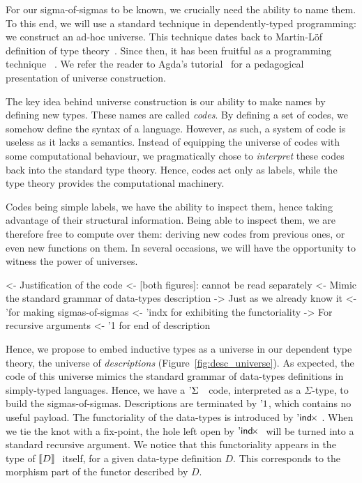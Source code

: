 
For our sigma-of-sigmas to be known, we crucially need the ability to
name them. To this end, we will use a standard technique in
dependently-typed programming: we construct an ad-hoc universe. This
technique dates back to Martin-L\"of definition of type
theory~\cite{martin-lof:itt}. Since then, it has been fruitful as a
programming technique~\cite{who?} . We refer
the reader to Agda's tutorial~\cite{norell:agda-tutorial} for a
pedagogical presentation of universe construction.

The key idea behind universe construction is our ability to make names
by defining new types. These names are called \emph{codes}. By
defining a set of codes, we somehow define the syntax of a
language. However, as such, a system of code is useless as it lacks a
semantics. Instead of equipping the universe of codes with some
computational behaviour, we pragmatically chose to \emph{interpret}
these codes back into the standard type theory. Hence, codes act only
as labels, while the type theory provides the computational machinery.

Codes being simple labels, we have the ability to inspect them, hence
taking advantage of their structural information. Being able to
inspect them, we are therefore free to compute over them: deriving new
codes from previous ones, or even new functions on them. In several
occasions, we will have the opportunity to witness the power of
universes.


\begin{wstructure}
<- Justification of the code 
    <- [both figures]: cannot be read separately
    <- Mimic the standard grammar of data-types description
        -> Just as we already know it
        <- '\Sigma for making sigmas-of-sigmas
        <- 'indx for exhibiting the functoriality
            -> For recursive arguments
        <- '1 for end of description
\end{wstructure}

Hence, we propose to embed inductive types as a universe in our
dependent type theory, the universe of \emph{descriptions}
(Figure~\ref{fig:desc_universe}). As expected, the code of this
universe mimics the standard grammar of data-types definitions in
simply-typed languages. Hence, we have a $\DSigma{}{}$ code,
interpreted as a $\Sigma$-type, to build the
sigmas-of-sigmas. Descriptions are terminated by $\DUnit$, which
contains no useful payload. The functoriality of the data-types is
introduced by $\DIndx$. When we tie the knot with a fix-point, the
hole left open by $\DIndx$ will be turned into a standard recursive
argument. We notice that this functoriality appears in the type of
$\descop{D}{}$ itself, for a given data-type definition $D$. This
corresponds to the morphism part of the functor described by $D$.

